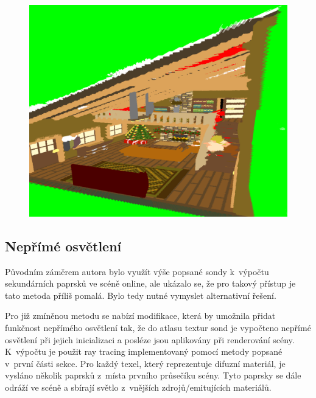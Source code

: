 \begin{figure}[H]
	\centering
	\includegraphics[scale=1]{images/probe_scene_render.png}
	\captionsetup{justification=centering}
	\label{fig:lfp_scene_render}
\end{figure}

\subsection{Nepřímé osvětlení}\label{sec:indirect}
Původním záměrem autora bylo využít výše popsané sondy k~výpočtu sekundárních paprsků ve scéně online, ale ukázalo se, že pro takový přístup je tato metoda příliš pomalá. Bylo tedy nutné vymyslet alternativní řešení.

Pro již zmíněnou metodu se nabízí modifikace, která by umožnila přidat funkčnost nepřímého osvětlení tak, že do atlasu textur sond je vypočteno nepřímé osvětlení při jejich inicializaci a posléze jsou aplikovány při renderování scény.  K~výpočtu je použit ray tracing implementovaný pomocí metody popsané v~první části sekce. Pro každý texel, který reprezentuje difuzní materiál, je vysláno několik paprsků z~místa prvního průsečíku scény. Tyto paprsky se dále odráží ve scéně a sbírají světlo z~vnějších zdrojů/emitujících materiálů.


